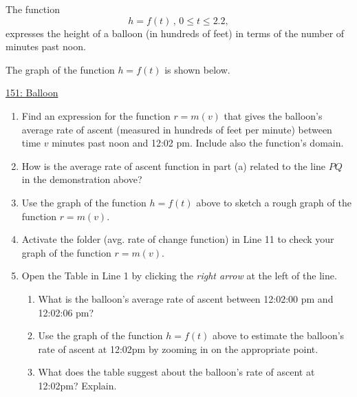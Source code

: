 \documentclass{ximera}
\begin{document}
\begin{question}  \label{Q4ghg5t4t4tr4}
The function
\[
      h = f(t)  \, , \, 0\leq t \leq 2.2 ,                     %
\]
expresses the height of a balloon (in hundreds of feet) in terms of the number of minutes past noon.

The graph of the function $h=f(t)$ is shown below.

\begin{onlineOnly}
    \begin{center}
\end{center}
\end{onlineOnly}

\href{https://www.desmos.com/calculator/kovtjpsebu}{151: Balloon}

\begin{enumerate}

\item Find an expression for the function $r=m(v)$ that gives the balloon's average rate of ascent (measured in hundreds of feet per minute) between time $v$ minutes past noon and 12:02 pm. Include also the function's domain.

\item How is the average rate of ascent function in part (a) related to the line $PQ$ in the demonstration above?

\item Use the graph of the function $h=f(t)$ above to sketch a rough graph of the function $r=m(v)$.

\item Activate the folder (avg. rate of change function) in Line 11 to check your graph of the function $r=m(v)$. 

\item Open the Table in Line 1 by clicking the \emph{right arrow} at the left of the line. 

\begin{enumerate}
\item What is the balloon's average rate of ascent between 12:02:00 pm and 12:02:06 pm?

\item Use the graph of the function $h=f(t)$ above to estimate the balloon's rate of ascent at 12:02pm by zooming in on the appropriate point.

\item What does the table suggest about the balloon's rate of ascent at 12:02pm? Explain.
\end{enumerate}


\end{enumerate}
\end{question}
\end{document}
